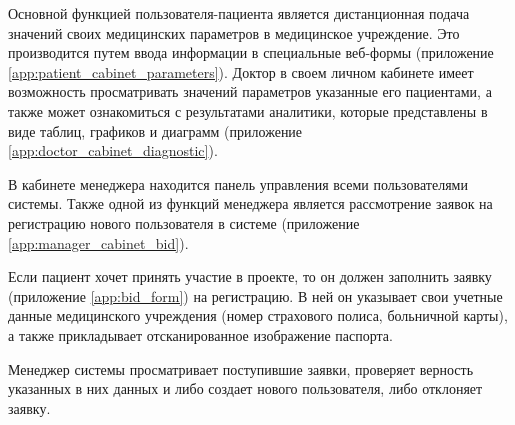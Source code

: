 Основной функцией пользователя-пациента является дистанционная подача  значений
своих медицинских параметров в медицинское учреждение. Это производится путем
ввода информации в специальные веб-формы (приложение
\ref{app:patient_cabinet_parameters}). Доктор в своем личном кабинете имеет
возможность просматривать значений параметров указанные его пациентами, а также
может ознакомиться с результатами аналитики, которые представлены в виде таблиц,
графиков и диаграмм (приложение \ref{app:doctor_cabinet_diagnostic}).

В кабинете менеджера находится панель управления всеми пользователями системы.
Также одной из функций менеджера является рассмотрение заявок на регистрацию
нового пользователя в системе (приложение \ref{app:manager_cabinet_bid}).

Если пациент хочет принять участие в проекте, то он должен заполнить заявку
(приложение \ref{app:bid_form}) на регистрацию. В ней он указывает свои учетные
данные медицинского учреждения (номер страхового полиса, больничной карты), а
также прикладывает отсканированное изображение паспорта.

Менеджер системы просматривает поступившие заявки, проверяет верность указанных
в них данных и либо создает нового пользователя, либо отклоняет заявку.